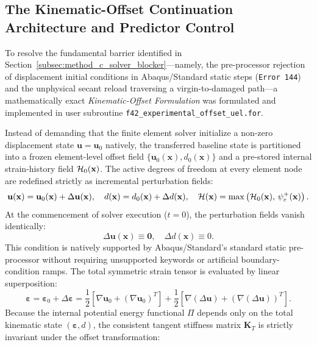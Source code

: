 \subsection{The Kinematic-Offset Continuation Architecture and Predictor Control}
\label{subsec:method_c_kinematic_offset}

To resolve the fundamental barrier identified in Section~\ref{subsec:method_c_solver_blocker}---namely, the pre-processor rejection of displacement initial conditions in Abaqus/Standard static steps (\texttt{Error 144}) and the unphysical secant reload traversing a virgin-to-damaged path---a mathematically exact \emph{Kinematic-Offset Formulation} was formulated and implemented in user subroutine \texttt{f42\_experimental\_offset\_uel.for}.

Instead of demanding that the finite element solver initialize a non-zero displacement state $\mathbf{u} = \mathbf{u}_0$ natively, the transferred baseline state is partitioned into a frozen element-level offset field $\{\mathbf{u}_0(\mathbf{x}), d_0(\mathbf{x})\}$ and a pre-stored internal strain-history field $\mathcal{H}_0(\mathbf{x})$. The active degrees of freedom at every element node are redefined strictly as incremental perturbation fields:
\begin{equation}
  \mathbf{u}(\mathbf{x}) = \mathbf{u}_0(\mathbf{x}) + \Delta\mathbf{u}(\mathbf{x}), \quad
  d(\mathbf{x}) = d_0(\mathbf{x}) + \Delta d(\mathbf{x}), \quad
  \mathcal{H}(\mathbf{x}) = \max\left(\mathcal{H}_0(\mathbf{x}),\, \psi_e^+(\mathbf{x})\right).
  \label{eq:kinematic_offset_decomposition}
\end{equation}
At the commencement of solver execution ($t = 0$), the perturbation fields vanish identically:
\begin{equation}
  \Delta\mathbf{u}(\mathbf{x}) \equiv \mathbf{0}, \quad \Delta d(\mathbf{x}) \equiv 0.
\end{equation}
This condition is natively supported by Abaqus/Standard's standard static pre-processor without requiring unsupported keywords or artificial boundary-condition ramps. The total symmetric strain tensor is evaluated by linear superposition:
\begin{equation}
  \boldsymbol{\varepsilon} = \boldsymbol{\varepsilon}_0 + \Delta\boldsymbol{\varepsilon} = \frac{1}{2}\left[\nabla\mathbf{u}_0 + (\nabla\mathbf{u}_0)^T\right] + \frac{1}{2}\left[\nabla(\Delta\mathbf{u}) + (\nabla(\Delta\mathbf{u}))^T\right].
\end{equation}
Because the internal potential energy functional $\Pi$ depends only on the total kinematic state $(\boldsymbol{\varepsilon}, d)$, the consistent tangent stiffness matrix $\mathbf{K}_T$ is strictly invariant under the offset transformation:
